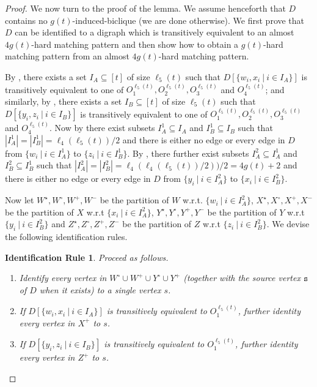 \documentclass[a4paper,11pt]{article}
\theoremstyle{plain}
\newtheorem{identification rule}{Identification Rule}
\theoremstyle{definition}
\theoremstyle{remark}
\newcommand{\sss}{\texttt{s}}
\begin{document}
\begin{proof}
\newcommand{\sizeWZ}{\ell_4(\ell_5(t))/2}
\newcommand{\sizeXY}{4g(t)+2}
\newcommand{\sizeXYo}{4g(t)+1}
\newcommand{\sizeXYt}{4g(t)}

We now turn to the proof of the lemma. We assume henceforth that $D$ contains no $g(t)$-induced-biclique (we are done otherwise). We first prove that $D$ can be identified to a digraph which is transitively equivalent to an almost $\sizeXYt$-hard matching pattern and then show how to obtain a $g(t)$-hard matching pattern from an almost $4g(t)$-hard matching pattern. 

By , there exists a set $I_A \subseteq [t]$ of size $\ell_5(t)$ such that $D[\{w_i,x_i~|~i \in I_A\}]$ is transitively equivalent to one of $O_1^{\ell_5(t)},O_2^{\ell_5(t)},O_3^{\ell_5(t)}$ and $O_4^{\ell_5(t)}$; and similarly, by , there exists a set $I_B \subseteq [t]$ of size $\ell_5(t)$ such that $D[\{y_i,z_i~|~i\in I_B\}]$ is transitively equivalent to one of $O_1^{\ell_5(t)},O_2^{\ell_5(t)},O_3^{\ell_5(t)}$ and $O_4^{\ell_5(t)}$. 
Now by  there exist subsets $I_A^1 \subseteq I_A$ and $I_B^1 \subseteq I_B$ such that $|I_A^1| = |I_B^1| = \sizeWZ$ and there is either no edge or every edge in $D$ from $\{w_i~|~i \in I_A^1\}$ to $\{z_i~|~i \in I_B^1\}$. 
By , there further exist subsets $I_A^2 \subseteq I_A^1$ and $I_B^2 \subseteq I_B^1$ such that $|I_A^2| = |I_B^2| = \ell_4(\ell_4(\ell_5(t))/2))/2 = \sizeXY$ and there is either no edge or every edge in $D$ from $\{y_i~|~i \in I_A^2\}$ to $\{x_i~|~i \in I_B^2\}$.
 
Now let $W^\star,W^\circ,W^+,W^-$ be the partition of $W$ w.r.t. $\{w_i~|~i \in I_A^2\}$,
$X^\star,X^\circ,X^+,X^-$ be the partition of $X$ w.r.t $\{x_i~|~i \in I_A^2\}$,
$Y^\star,Y^\circ,Y^+,Y^-$ be the partition of $Y$ w.r.t $\{y_i~|~i \in I_B^2\}$ 
and $Z^\star,Z^\circ,Z^+,Z^-$ be the partition of $Z$ w.r.t $\{z_i~|~i \in I_B^2\}$.
We devise the following identification rules.

\begin{identification rule}
\label{ir:source}
Proceed as follows.
\begin{enumerate}[nosep]
\item Identify every vertex in $W^\circ \cup W^+ \cup Y^\circ \cup Y^+$ (together with the source vertex $\sss$ of $D$ when it exists) to a single vertex $s$.
\item If $D[\{w_i,x_i~|~i \in I_A\}]$ is transitively equivalent to $O_1^{\ell_5(t)}$, further identity every vertex in $X^+$ to $s$.
\item If $D[\{y_i,z_i~|~i \in I_B\}]$ is transitively equivalent to $O_1^{\ell_5(t)}$, further identity every vertex in $Z^+$ to $s$.
\end{enumerate}
\end{identification rule}


\end{proof}
\end{document}

